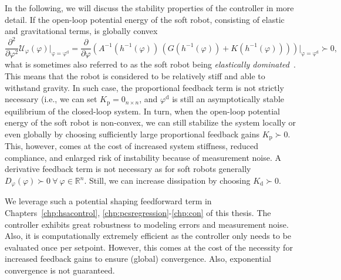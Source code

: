 In the following, we will discuss the stability properties of the controller in more detail.
If the open-loop potential energy of the soft robot, consisting of elastic and gravitational terms, is globally convex
\begin{equation}
    \frac{\partial^2}{\partial \varphi^2} \mathcal{U}_{\varphi}(\varphi) \bigg |_\mathrm{\varphi = \varphi^\mathrm{d}} = \frac{\partial}{\partial \varphi} \left (  A^{-1}(h^{-1}(\varphi)) \,  \left ( G(h^{-1}(\varphi)) + K(h^{-1}(\varphi)) \right ) \right ) \bigg |_\mathrm{\varphi = \varphi^\mathrm{d}} \succ 0, 
\end{equation}
what is sometimes also referred to as the soft robot being \emph{elastically dominated}~\citep{borja2022energy, della2023model, pustina2025analysis}. This means that the robot is considered to be relatively stiff and able to withstand gravity. In such case, the proportional feedback term is not strictly necessary (i.e., we can set $K_\mathrm{p} = 0_{n \times n}$, and $\varphi^\mathrm{d}$ is still an asymptotically stable equilibrium of the closed-loop system.
In turn, when the open-loop potential energy of the soft robot is non-convex, we can still stabilize the system locally or even globally by choosing sufficiently large proportional feedback gains $K_\mathrm{p} \succ 0$.
This, however, comes at the cost of increased system stiffness, reduced compliance, and enlarged risk of instability because of measurement noise.
A derivative feedback term is not necessary as for soft robots generally $D_\varphi(\varphi) \succ 0 \: \forall \: \varphi \in \mathbb{R}^n$. Still, we can increase dissipation by choosing $K_\mathrm{d} \succ 0$.

We leverage such a potential shaping feedforward term in Chapters~\ref{chp:hsacontrol}, \ref{chp:pcsregression}-\ref{chp:con} of this thesis.
The controller exhibits great robustness to modeling errors and measurement noise.
Also, it is computationally extremely efficient as the controller only needs to be evaluated once per setpoint.
However, this comes at the cost of the necessity for increased feedback gains to ensure (global) convergence. Also, exponential convergence is not guaranteed.



